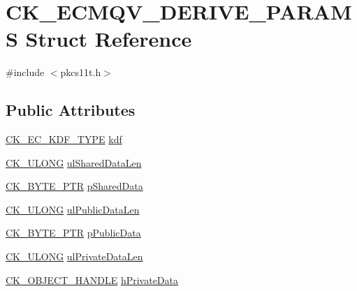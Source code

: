 \hypertarget{struct_c_k___e_c_m_q_v___d_e_r_i_v_e___p_a_r_a_m_s}{}\section{C\+K\+\_\+\+E\+C\+M\+Q\+V\+\_\+\+D\+E\+R\+I\+V\+E\+\_\+\+P\+A\+R\+A\+MS Struct Reference}
\label{struct_c_k___e_c_m_q_v___d_e_r_i_v_e___p_a_r_a_m_s}


{\ttfamily \#include $<$pkcs11t.\+h$>$}

\subsection*{Public Attributes}
\begin{DoxyCompactItemize}
\item 
\hyperlink{pkcs11t_8h_a25c4c2080a9de6b88ec16c6e9c776e56}{C\+K\+\_\+\+E\+C\+\_\+\+K\+D\+F\+\_\+\+T\+Y\+PE} \hyperlink{struct_c_k___e_c_m_q_v___d_e_r_i_v_e___p_a_r_a_m_s_a6523ea90581ae79210ee33ae76c4d400}{kdf}
\item 
\hyperlink{pkcs11t_8h_a35181858a3b7a0a81f49d180d8f446ef}{C\+K\+\_\+\+U\+L\+O\+NG} \hyperlink{struct_c_k___e_c_m_q_v___d_e_r_i_v_e___p_a_r_a_m_s_a4f8f542bd44043a05653f0f6c8b66a6d}{ul\+Shared\+Data\+Len}
\item 
\hyperlink{pkcs11t_8h_a3d7233a4077fbaf7ae76b64da0a62a21}{C\+K\+\_\+\+B\+Y\+T\+E\+\_\+\+P\+TR} \hyperlink{struct_c_k___e_c_m_q_v___d_e_r_i_v_e___p_a_r_a_m_s_a9db74537f49450c787fb570c7ead5834}{p\+Shared\+Data}
\item 
\hyperlink{pkcs11t_8h_a35181858a3b7a0a81f49d180d8f446ef}{C\+K\+\_\+\+U\+L\+O\+NG} \hyperlink{struct_c_k___e_c_m_q_v___d_e_r_i_v_e___p_a_r_a_m_s_a54d61278e6b0fb56b068e2473e716757}{ul\+Public\+Data\+Len}
\item 
\hyperlink{pkcs11t_8h_a3d7233a4077fbaf7ae76b64da0a62a21}{C\+K\+\_\+\+B\+Y\+T\+E\+\_\+\+P\+TR} \hyperlink{struct_c_k___e_c_m_q_v___d_e_r_i_v_e___p_a_r_a_m_s_a6043a95e6203942d453f2a94bb88a416}{p\+Public\+Data}
\item 
\hyperlink{pkcs11t_8h_a35181858a3b7a0a81f49d180d8f446ef}{C\+K\+\_\+\+U\+L\+O\+NG} \hyperlink{struct_c_k___e_c_m_q_v___d_e_r_i_v_e___p_a_r_a_m_s_ab97c5df4ea59baf62d982a16b7e0869e}{ul\+Private\+Data\+Len}
\item 
\hyperlink{pkcs11t_8h_ad1cdd703196214cd34e6f9f52bc67683}{C\+K\+\_\+\+O\+B\+J\+E\+C\+T\+\_\+\+H\+A\+N\+D\+LE} \hyperlink{struct_c_k___e_c_m_q_v___d_e_r_i_v_e___p_a_r_a_m_s_a9ba1429299801b8e12bf02367d8c0c55}{h\+Private\+Data}

\end{DoxyCompactItemize}
